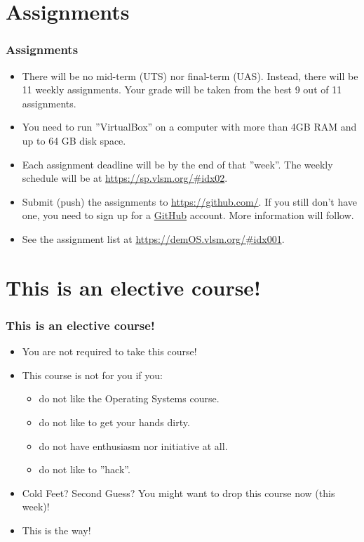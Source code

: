 \documentclass[aspectratio=169, xcolor=table, notheorems, hyperref={pdfpagelabels=false}]{beamer}
\begin{document}
\section{Assignments}
\begin{frame}[fragile]
\frametitle{Assignments}
\begin{itemize}
\item There will be no mid-term (UTS) nor final-term (UAS).
      Instead, there will be 11 weekly assignments.
      Your grade will be taken from the best 9 out of 11 assignments.
\item You need to run ''VirtualBox'' on a computer with more than 4GB RAM and up to 64 GB disk space.
\item Each assignment deadline will be by the end of that ''week''.
      The weekly schedule will be at \url{https://sp.vlsm.org/\#idx02}.
\item Submit (push) the assignments to \url{https://github.com/}.
      If you still don't have one, you need to sign up for a \href{https://github.com/}{GitHub} account.
      More information will follow.
\item See the assignment list at \url{https://demOS.vlsm.org/#idx001}.
\end{itemize}
\end{frame}

\section{This is an elective course!}
\begin{frame}[fragile]
\frametitle{This is an elective course!}

\begin{itemize}
\item You are not required to take this course!
\item This course is not for you if you:
\begin{itemize}
\item do not like the Operating Systems course.
\item do not like to get your hands dirty.
\item do not have enthusiasm nor initiative at all.
\item do not like to ''hack''.
\end{itemize}
\item Cold Feet? Second Guess?  You might want to drop this course now (this week)!
\item This is the way!
\end{itemize}

\end{frame}
\end{document}

